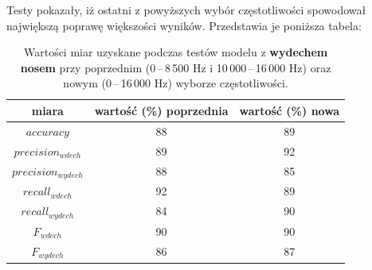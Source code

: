 \documentclass[polish]{article}
\begin{document}
Testy pokazały, iż ostatni z powyższych wybór częstotliwości spowodował największą poprawę większości wyników. Przedstawia je poniższa tabela:
\begin{table}[H]
\caption{Wartości miar uzyskane podczas testów modelu z \textbf{wydechem nosem} przy poprzednim (0\,--\,8\,500 \unit{Hz} i 10\,000\,--\,16\,000 \unit{Hz}) oraz nowym (0\,--\,16\,000 \unit{Hz}) wyborze częstotliwości.}
\begin{center}
\begin{tabular}{c | c | c}
	miara & wartość (\%) poprzednia & wartość (\%) nowa \\
	\hline
	$accuracy$ & 88 & 89 \\
	$precision_{wdech}$ & 89 & 92 \\
	$precision_{wydech}$ & 88 & 85 \\
	$recall_{wdech}$ & 92 & 89 \\
	$recall_{wydech}$ & 84 & 90 \\
	$F_{wdech}$ & 90 & 90 \\
	$F_{wydech}$ & 86 & 87
\end{tabular}
\end{center}
\end{table}
\end{document}
